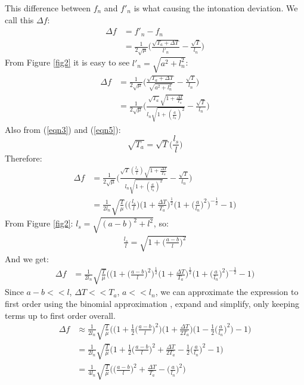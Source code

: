 This difference between $f_n$ and $f'_n$ is what causing the intonation deviation. We call this $\Delta f$:
\begin{align}
    \Delta f &= f'_n - f_n \\
    &= \frac{1}{2\sqrt{\mu}} \bigg(\frac{\sqrt{T_a + \Delta T}}{l'_n} - \frac{\sqrt{T}}{l_n} \bigg)
\end{align}
From Figure \ref{fig2} it is easy to see $l'_n = \sqrt{a^2 + l_n^2}$:
\begin{align}
    \Delta f &= \frac{1}{2\sqrt{\mu}} \bigg(\frac{\sqrt{T_a + \Delta T}}{\sqrt{a^2 + l_n^2}} - \frac{\sqrt{T}}{l_n} \bigg) \\
    &= \frac{1}{2\sqrt{\mu}} \bigg(\frac{\sqrt{T_a}  \sqrt{1 + \frac{\Delta T}{T_a} }}{l_n \sqrt{1 + (\frac{a}{l_n})^2}} - \frac{\sqrt{T}}{l_n} \bigg)
\end{align}
Also from (\ref{eqn3}) and (\ref{eqn5}):
\begin{equation} \label{eqn11}
    \sqrt{T_a} = \sqrt{T} \bigg(\frac{l_s}{l}\bigg)
\end{equation}
Therefore:
\begin{align}
    \Delta f &= \frac{1}{2\sqrt{\mu}} \Bigg(\frac{ \sqrt{T} (\frac{l_s}{l}) \sqrt{1 + \frac{\Delta T}{T_a} }}{l_n \sqrt{1 + (\frac{a}{l_n})^2}} - \frac{\sqrt{T}}{l_n} \Bigg) \\
    &= \frac{1}{2l_n} \sqrt{\frac{T}{\mu}} \Bigg(\bigg(\frac{l_s}{l}\bigg) \bigg(1 + \frac{\Delta T}{T_a}\bigg)^\frac{1}{2} \bigg(1 + \bigg(\frac{a}{l_n}\bigg)^2 \bigg)^{-\frac{1}{2}} - 1 \Bigg)
\end{align}
From Figure \ref{fig2}: $l_s = \sqrt{(a-b)^2 + l^2}$, so:
\begin{align*}
    \frac{l_s}{l} = \sqrt{1 + \bigg(\frac{a-b}{l}\bigg)^2}
\end{align*}
And we get:
\begin{align}
    \Delta f &= \frac{1}{2l_n} \sqrt{\frac{T}{\mu}} \Bigg(\bigg( 1 + \bigg(\frac{a-b}{l}\bigg)^2\bigg)^\frac{1}{2} \bigg(1 + \frac{\Delta T}{T_a}\bigg)^\frac{1}{2} \bigg(1 + \bigg(\frac{a}{l_n}\bigg)^2\bigg)^{-\frac{1}{2}} - 1 \Bigg)
\end{align}
Since $a-b << l$, $\Delta T << T_a$, $a << l_n$, we can approximate the expression to first order using the binomial approximation \cite{spakula}, expand and simplify, only keeping terms up to first order overall.
\begin{align}
    \Delta f &\approx \frac{1}{2l_n} \sqrt{\frac{T}{\mu}} \Bigg(\bigg( 1 + \frac{1}{2}\bigg(\frac{a-b}{l}\bigg)^2 \bigg) \bigg(1 + \frac{\Delta T}{2T_a}\bigg) \bigg(1 - \frac{1}{2} \bigg(\frac{a}{l_n}\bigg)^2\bigg) - 1 \Bigg) \\
    &= \frac{1}{2l_n} \sqrt{\frac{T}{\mu}} \Bigg(1 + \frac{1}{2}\bigg(\frac{a-b}{l}\bigg)^2 + \frac{\Delta T}{2T_a} - \frac{1}{2} \bigg(\frac{a}{l_n}\bigg)^2 - 1 \Bigg) \\
    &= \frac{1}{4l_n} \sqrt{\frac{T}{\mu}} \Bigg( \bigg(\frac{a-b}{l}\bigg)^2 + \frac{\Delta T}{T_a} - \bigg(\frac{a}{l_n}\bigg)^2 \Bigg) \label{eqn17}
\end{align}